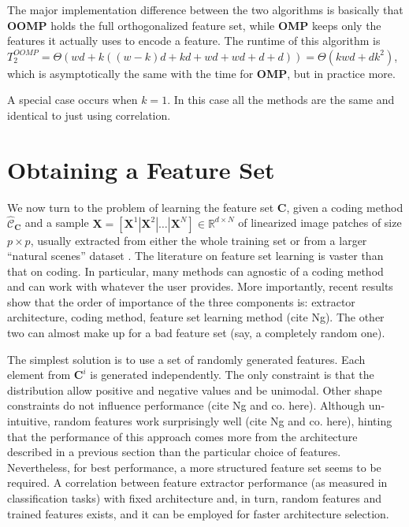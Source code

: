 \documentclass[12pt,a4paper,oneside,english]{UPBThesis}
\newcommand{\hctimes}[2]{{#1}\!\times\!{#2}}
\begin{document}
The major implementation difference between the two algorithms is basically that \textbf{OOMP} holds the full orthogonalized feature set, while \textbf{OMP} keeps only the features it actually uses to encode a feature. The runtime of this algorithm is $T_2^{OOMP} = \Theta(wd + k((w-k)d + kd + wd + wd + d + d)) = \Theta(kwd + dk^2)$, which is asymptotically the same with the time for \textbf{OMP}, but in practice more.

A special case occurs when $k=1$. In this case all the methods are the same and identical to just using correlation.

\chapter{Obtaining a Feature Set}
\label{chap:ObtainingFeatureSet}

We now turn to the problem of learning the feature set $\textbf{C}$, given a coding method $\hat{\mathcal{C}}_\textbf{C}$ and a sample $\textbf{X} = \left[ \textbf{X}^1 \left|\right. \textbf{X}^2 \left|\right. \dots \left|\right. \textbf{X}^N \right] \in \mathbb{R}^{\hctimes{d}{N}}$ of linearized image patches of size $\hctimes{p}{p}$, usually extracted from either the whole training set or from a larger ``natural scenes'' dataset \cite{self-taught-learning}. The literature on feature set learning is vaster than that on coding. In particular, many methods can agnostic of a coding method and can work with whatever the user provides. More importantly, recent results show that the order of importance of the three components is: extractor architecture, coding method, feature set learning method (cite Ng). The other two can almost make up for a bad feature set (say, a completely random one).

The simplest solution is to use a set of randomly generated features. Each element from $\textbf{C}^i$ is generated independently. The only constraint is that the distribution allow positive and negative values and be unimodal. Other shape constraints do not influence performance (cite Ng and co. here). Although un-intuitive, random features work surprisingly well (cite Ng and co. here), hinting that the performance of this approach comes more from the architecture described in a previous section than the particular choice of features. Nevertheless, for best performance, a more structured feature set seems to be required. A correlation between feature extractor performance (as measured in classification tasks) with fixed architecture and, in turn, random features and trained features exists, and it can be employed for faster architecture selection.
\end{document}
